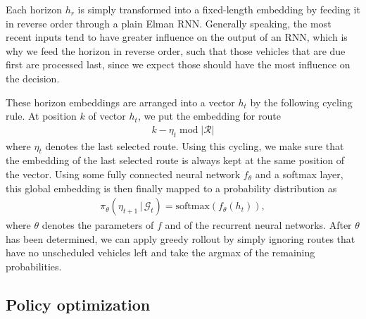 \documentclass[a4paper]{report}
\theoremstyle{definition}
\theoremstyle{plain}
\begin{document}
Each horizon $h_r$ is simply transformed into
a fixed-length embedding by feeding it in reverse order through a plain Elman
RNN. Generally speaking, the most recent inputs tend to have greater influence
on the output of an RNN, which is why we feed the horizon in reverse order, such
that those vehicles that are due first are processed last, since we expect those
should have the most influence on the decision.

These horizon embeddings are arranged into a vector $h_{t}$ by the following
cycling rule. At position $k$ of vector $h_{t}$, we put the embedding for route
\begin{align*}
  k - \eta_{t} \; \mathrm{mod} \; |\mathcal{R}|
\end{align*}
where $\eta_{t}$ denotes the last selected route. Using this cycling, we make sure
that the embedding of the last selected route is always kept at the same
position of the vector.
%
Using some fully connected neural network $f_{\theta}$ and a softmax layer, this
global embedding is then finally mapped to a probability distribution as
\begin{align*}
  \pi_{\theta}(\eta_{t+1} \, | \, \mathcal{G}_{t}) = \text{softmax} ( f_{\theta}(h_{t})) ,
\end{align*}
where $\theta$ denotes the parameters of $f$ and of the recurrent neural
networks.
After $\theta$ has been determined, we can apply greedy rollout by simply
ignoring routes that have no unscheduled vehicles left and take the argmax of
the remaining probabilities.




\clearpage

\subsection{Policy optimization}
\end{document}
